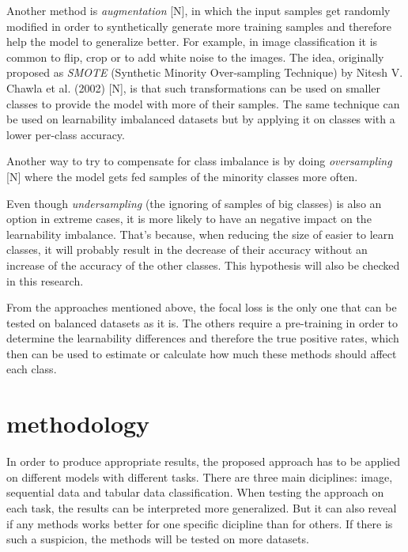 \documentclass[journal]{IEEEtran}
\begin{document}
Another method is \emph{augmentation} [N], in which the input samples get randomly modified in order to synthetically generate more training samples and therefore help the model to generalize better. 
For example, in image classification it is common to flip, crop or to add white noise to the images. 
The idea, originally proposed as \emph{SMOTE} (Synthetic Minority Over-sampling Technique) by Nitesh V. Chawla et al. (2002) [N], is that such transformations can be used on smaller classes to provide the model with more of their samples.
The same technique can be used on learnability imbalanced datasets but by applying it on classes with a lower per-class accuracy.


Another way to try to compensate for class imbalance is by doing \emph{oversampling} [N] where the model gets fed samples of the minority classes more often.

Even though \emph{undersampling} (the ignoring of samples of big classes) is also an option in extreme cases, it is more likely to have an negative impact on the learnability imbalance.
That's because, when reducing the size of easier to learn classes, it will probably result in the decrease of their accuracy without an increase of the accuracy of the other classes.
This hypothesis will also be checked in this research.

From the approaches mentioned above, the focal loss is the only one that can be tested on balanced datasets as it is. 
The others require a pre-training in order to determine the learnability differences and therefore the true positive rates, which then can be used to estimate or calculate how much these methods should affect each class.

\section{methodology}
In order to produce appropriate results, the proposed approach has to be applied on different models with different tasks. 
There are three main diciplines: image, sequential data and tabular data classification. 
When testing the approach on each task, the results can be interpreted more generalized. 
But it can also reveal if any methods works better for one specific dicipline than for others. 
If there is such a suspicion, the methods will be tested on more datasets.
\end{document}
